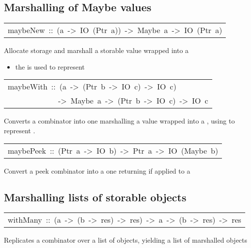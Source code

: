\subsection{Marshalling of Maybe values
}
\begin{haddockdesc}
\item[\begin{tabular}{@{}l}
maybeNew\ ::\ (a\ ->\ IO\ (Ptr\ a))\ ->\ Maybe\ a\ ->\ IO\ (Ptr\ a)
\end{tabular}]\haddockbegindoc
Allocate storage and marshall a storable value wrapped into a 
\par
\begin{itemize}
\item
 the  is used to represent 
\par

\end{itemize}

\end{haddockdesc}
\begin{haddockdesc}
\item[\begin{tabular}{@{}l}
maybeWith\ ::\ (a\ ->\ (Ptr\ b\ ->\ IO\ c)\ ->\ IO\ c)\\\ \ \ \ \ \ \ \ \ \ \ \ \ ->\ Maybe\ a\ ->\ (Ptr\ b\ ->\ IO\ c)\ ->\ IO\ c
\end{tabular}]\haddockbegindoc
Converts a  combinator into one marshalling a value wrapped
 into a , using  to represent .
\par

\end{haddockdesc}
\begin{haddockdesc}
\item[\begin{tabular}{@{}l}
maybePeek\ ::\ (Ptr\ a\ ->\ IO\ b)\ ->\ Ptr\ a\ ->\ IO\ (Maybe\ b)
\end{tabular}]\haddockbegindoc
Convert a peek combinator into a one returning  if applied to a
\par

\end{haddockdesc}
\subsection{Marshalling lists of storable objects
}
\begin{haddockdesc}
\item[\begin{tabular}{@{}l}
withMany\ ::\ (a\ ->\ (b\ ->\ res)\ ->\ res)\ ->\ {\char 91}a{\char 93}\ ->\ ({\char 91}b{\char 93}\ ->\ res)\ ->\ res
\end{tabular}]\haddockbegindoc
Replicates a  combinator over a list of objects, yielding a list of
 marshalled objects
\par

\end{haddockdesc}

